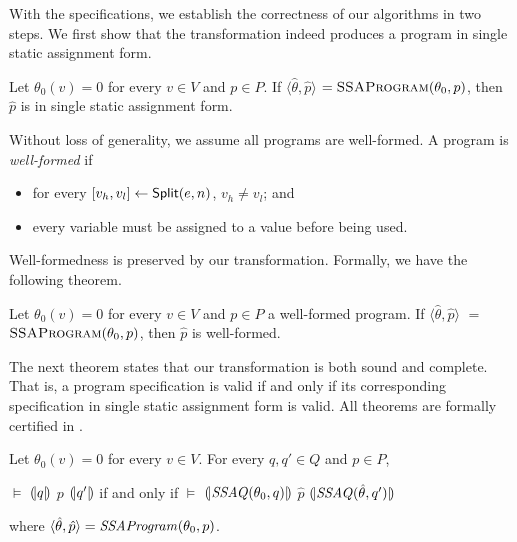 With the \coq specifications, we establish the correctness of our
algorithms in two steps. We first show that the transformation indeed
produces a program in single static assignment form.
\begin{theorem}
  Let $\theta_0(v) = 0$ for every $v \in V$ and $p \in P$.
  If $\langle \hat{\theta}, \hat{p} \rangle$ $=
  \textsc{SSAProgram}(\theta_0, p)$, then 
  $\hat{p}$ is in single static assignment form.
\end{theorem}

Without loss of generality, we assume all programs are well-formed. 
A program is \emph{well-formed} if
\begin{itemize}
\item for every ${[}{v_h}, {v_l}{]} \leftarrow \mbox{\textsf{Split}}(e, n)$, $v_h
  \neq v_l$; and
\item every variable must be assigned to a value before being used.
\end{itemize}
Well-formedness is preserved by our transformation. Formally, we have
the following theorem.
\begin{theorem}
  Let $\theta_0(v) = 0$ for every $v \in V$ and $p \in P$ a
  well-formed program. If $\langle \hat{\theta}, \hat{p} \rangle$ $=$ 
  $\textsc{SSAProgram}(\theta_0, p)$, then $\hat{p}$ is well-formed.
\end{theorem}

The next theorem states that our transformation is both sound and
complete. That is, a program specification is valid if and only if its
corresponding specification in single static assignment form is valid.
All theorems are formally certified in \coq. 
\begin{theorem}
  Let $\theta_0(v) = 0$ for every $v \in V$. For every $q, q' \in Q$
  and $p \in P$,
  \begin{center}
    $\models$ ${(\!|}{q}{|\!)}$ $p$ ${(\!|}{q'}{|\!)}$ if and only if
    $\models$ ${(\!|}{\textmd{\textit{SSAQ}}(\theta_0, q)}{|\!)}$
    $\hat{p}$
    ${(\!|}{\textmd{\textit{SSAQ}}(\hat{\theta}, q')}{|\!)}$
  \end{center}
  where $\langle \hat{\theta}, \hat{p} \rangle =
  \textmd{\textit{SSAProgram}}(\theta_0, p)$.
\end{theorem}

